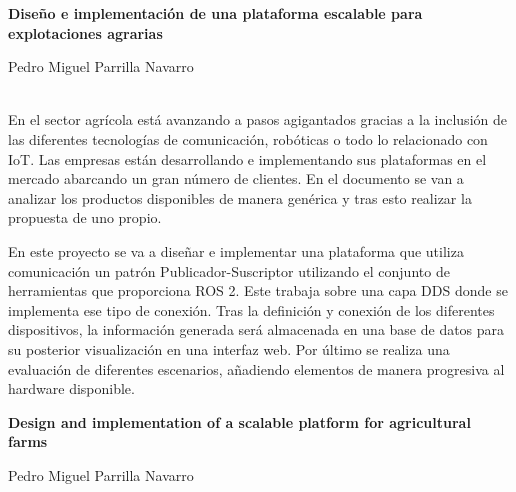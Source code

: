 \thispagestyle{empty}

\begin{center}
{\large\bfseries Diseño e implementación de una plataforma escalable para explotaciones agrarias }\\
\end{center}
\begin{center}
Pedro Miguel Parrilla Navarro\\
\end{center}

\vspace{0.5cm}
\vspace{0.7cm}

\\

En el sector agrícola está avanzando a pasos agigantados gracias a la inclusión de las diferentes tecnologías de comunicación, robóticas o todo lo relacionado con IoT. Las empresas están desarrollando e implementando sus plataformas en el mercado abarcando un gran número de clientes. En el documento se van a analizar los productos disponibles de manera genérica y tras esto realizar la propuesta de uno propio.

En este proyecto se va a diseñar e implementar una plataforma que utiliza comunicación un patrón Publicador-Suscriptor utilizando el conjunto de herramientas que proporciona ROS 2. Este trabaja sobre una capa DDS donde se implementa ese tipo de conexión. Tras la definición y conexión de los diferentes dispositivos, la información generada será almacenada en una base de datos para su posterior visualización en una interfaz web. Por último se realiza una evaluación de diferentes escenarios, añadiendo elementos de manera progresiva al hardware disponible.

\cleardoublepage

\begin{center}
	{\large\bfseries Design and implementation of a scalable platform for agricultural farms}\\
\end{center}
\begin{center}
	Pedro Miguel Parrilla Navarro\\
\end{center}
\vspace{0.5cm}
\vspace{0.7cm}

